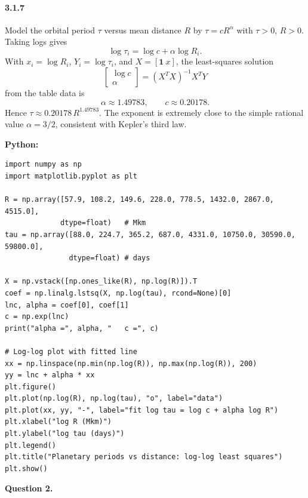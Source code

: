 \documentclass[11pt]{article}
\begin{document}
\paragraph{3.1.7}
Model the orbital period \(\tau\) versus mean distance \(R\) by \(\tau=c R^{\alpha}\) with \(\tau>0\), \(R>0\). Taking logs gives
\[
\log \tau_i = \log c + \alpha \log R_i .
\]
With \(x_i=\log R_i\), \(Y_i=\log \tau_i\), and \(X=[\mathbf{1}\ x]\), the least-squares solution
\[
\begin{bmatrix}\log c\\ \alpha\end{bmatrix}=(X^{T}X)^{-1}X^{T}Y
\]
from the table data is
\[
\alpha \approx 1.49783,\qquad c\approx 0.20178 .
\]
Hence \(\tau \approx 0.20178\, R^{1.49783}\). The exponent is extremely close to the simple rational value \(\alpha=3/2\), consistent with Kepler's third law.

\medskip
\noindent\textbf{Python:}
\begin{verbatim}
import numpy as np
import matplotlib.pyplot as plt

R = np.array([57.9, 108.2, 149.6, 228.0, 778.5, 1432.0, 2867.0, 4515.0],
             dtype=float)   # Mkm
tau = np.array([88.0, 224.7, 365.2, 687.0, 4331.0, 10750.0, 30590.0, 59800.0],
               dtype=float) # days

X = np.vstack([np.ones_like(R), np.log(R)]).T
coef = np.linalg.lstsq(X, np.log(tau), rcond=None)[0]
lnc, alpha = coef[0], coef[1]
c = np.exp(lnc)
print("alpha =", alpha, "   c =", c)

# Log-log plot with fitted line
xx = np.linspace(np.min(np.log(R)), np.max(np.log(R)), 200)
yy = lnc + alpha * xx
plt.figure()
plt.plot(np.log(R), np.log(tau), "o", label="data")
plt.plot(xx, yy, "-", label="fit log tau = log c + alpha log R")
plt.xlabel("log R (Mkm)")
plt.ylabel("log tau (days)")
plt.legend()
plt.title("Planetary periods vs distance: log-log least squares")
plt.show()
\end{verbatim}


\newpage



{\bf Question 2.}
\end{document}
